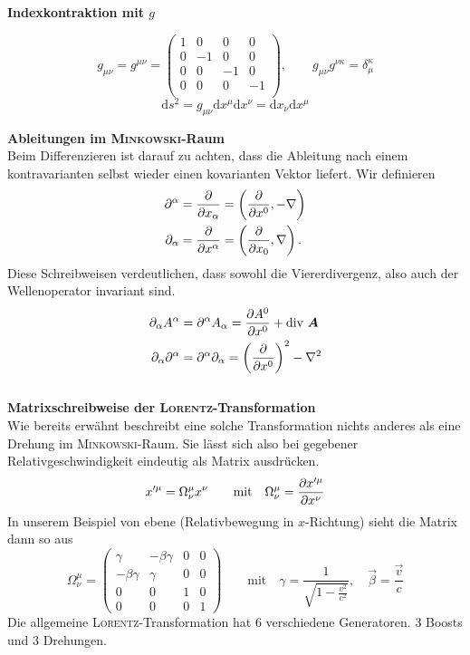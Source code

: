 \textbf{Indexkontraktion mit $g$}

\begin{equation*}
g_{\mu\nu}=g^{\mu\nu}=\begin{pmatrix}
1 & 0& 0 & 0 \\
0 &-1& 0 & 0\\
0 & 0 & -1 & 0 \\
0 & 0 & 0 & -1 \\
\end{pmatrix}, \qquad g_{\mu\nu}g^{\nu\kappa}=\delta_\mu^\kappa
\end{equation*}
\begin{equation*}
\mathrm{d}s^2 = g_{\mu\nu}\mathrm{d}x^\mu\mathrm{d}x^\nu=\mathrm{d}x_\nu\mathrm{d}x^\mu
\end{equation*}

\newpage
\textbf{Ableitungen im \textsc{Minkowski}-Raum}\\

Beim Differenzieren ist darauf zu achten, dass die Ableitung nach einem kontravarianten selbst wieder einen kovarianten Vektor liefert. Wir definieren
\begin{align*}
\partial^\alpha &= \frac{\partial{}}{\partial{x_\alpha}}=\left(\frac{\partial{}}{\partial{x^0}},-\nabla\right)\\
\partial_\alpha &= \frac{\partial{}}{\partial{x^\alpha}}=\left(\frac{\partial{}}{\partial{x_0}},\nabla\right).
\end{align*}
Diese Schreibweisen verdeutlichen, dass sowohl die Viererdivergenz, also auch der Wellenoperator invariant sind.
\begin{align*}
\partial_\alpha A^\alpha &= \partial^\alpha A_\alpha =\frac{\partial{A^0}}{\partial{x^0}}+\text{div }\bm{A}\\
\partial_\alpha\partial^\alpha&=\partial^\alpha\partial_\alpha = \left(\frac{\partial{}}{\partial{x^0}}\right)^2-\nabla^2
\end{align*}\\

\textbf{Matrixschreibweise der \textsc{Lorentz}-Transformation}\\

Wie bereits erwähnt beschreibt eine solche Transformation nichts anderes als eine Drehung im \textsc{Minkowski}-Raum. Sie lässt sich also bei gegebener Relativgeschwindigkeit eindeutig als Matrix ausdrücken.
\begin{equation*}
x'^\mu = \Omega_\nu^\mu x^\nu \qquad \text{mit}\quad \Omega_\nu^\mu = \frac{\partial{x'^\mu}}{\partial{x^\nu}}
\end{equation*}
In unserem Beispiel von ebene (Relativbewegung in $x$-Richtung) sieht die Matrix dann so aus
\begin{equation*}
\Omega_\nu^\mu = \begin{pmatrix}
\gamma &-\beta\gamma & 0 & 0 \\
-\beta\gamma & \gamma & 0 & 0 \\
0 & 0 & 1 & 0\\
0 & 0 & 0 & 1
\end{pmatrix}  \qquad \text{mit}\quad \gamma=\frac{1}{\sqrt{1-\frac{v^2}{c^2}}}, \quad \vec{\beta} = \frac{\vec{v}}{c}
\end{equation*}
Die allgemeine \textsc{Lorentz}-Transformation hat 6 verschiedene Generatoren. 3 Boosts und 3 Drehungen.
\newpage
